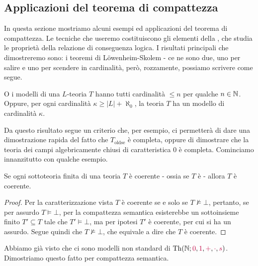 \subsection{Applicazioni del teorema di compattezza}
In questa sezione mostriamo alcuni esempi ed applicazioni del teorema di compattezza. Le tecniche che useremo costituiscono gli elementi della , che
studia le proprietà della relazione di conseguenza logica. I risultati principali che dimostreremo sono: i teoremi di Löwenheim-Skolem - ce ne sono due, uno per salire e uno per scendere in cardinalità,
però, rozzamente, possiamo scrivere come segue.

\begin{theorem}
    O i modelli di una $L$-teoria $T$ hanno tutti cardinalità $\leq n$ per qualche $n \in \mathbb N$. Oppure, per ogni cardinalità $\kappa \geq |L| + \aleph_0$, la teoria $T$ ha un modello di cardinalità $\kappa$. 
\end{theorem}

Da questo risultato segue un criterio che, per esempio, ci permetterà di dare una dimostrazione rapida del fatto che $T_{\text{oldse}}$ è completa, oppure di dimostrare che la 
teoria dei campi algebricamente chiusi di caratteristica 0 è completa. Cominciamo innanzitutto con qualche esempio.

\begin{proposition}
    Se ogni sottoteoria finita di una teoria $T$  è coerente - ossia se $T$ è  - allora $T$ è coerente.
\end{proposition}

\begin{proof}
    Per la caratterizzazione vista $T$ è coerente se e solo se $T\not\models \bot$, pertanto, se per assurdo $T \models \bot$, per la compattezza semantica esisterebbe un sottoinsieme finito $T' \subseteq T$ tale che $T' \models \bot$, ma
    per ipotesi $T'$ è coerente, per cui si ha un assurdo. Segue quindi che $T\not\models \bot$, che equivale a dire che $T$ è coerente.
\end{proof}

\begin{example}
    Abbiamo già visto che ci sono modelli non standard di $\operatorname{Th}(\mathbb N;\textcolor{purple}{0},\textcolor{purple}{1},\textcolor{purple}{+},\textcolor{purple}{\cdot},\textcolor{purple}{s})$. Dimostriamo questo fatto per compattezza semantica.
\end{example}

